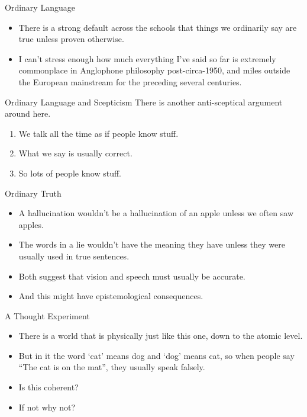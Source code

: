 \documentclass[
  17pt,
  letterpaper,
  ignorenonframetext,
  aspectratio=169,
  handout]{beamer}
\providecommand{\tightlist}{%
  \setlength{\itemsep}{0pt}\setlength{\parskip}{0pt}}\usepackage{longtable,booktabs,array}
\begin{document}
\begin{frame}{Ordinary Language}
\protect\hypertarget{ordinary-language}{}
\begin{itemize}[<+->]
\tightlist
\item
  There is a strong default across the schools that things we ordinarily
  say are true unless proven otherwise.
\item
  I can't stress enough how much everything I've said so far is
  extremely commonplace in Anglophone philosophy post-circa-1950, and
  miles outside the European mainstream for the preceding several
  centuries.
\end{itemize}
\end{frame}

\begin{frame}{Ordinary Language and Scepticism}
\protect\hypertarget{ordinary-language-and-scepticism}{}
There is another anti-sceptical argument around here.

\begin{enumerate}[<+->]
\tightlist
\item
  We talk all the time as if people know stuff.
\item
  What we say is usually correct.
\item
  So lots of people know stuff.
\end{enumerate}
\end{frame}

\begin{frame}{Ordinary Truth}
\protect\hypertarget{ordinary-truth}{}
\begin{itemize}[<+->]
\tightlist
\item
  A hallucination wouldn't be a hallucination of an apple unless we
  often saw apples.
\item
  The words in a lie wouldn't have the meaning they have unless they
  were usually used in true sentences.
\item
  Both suggest that vision and speech must usually be accurate.
\item
  And this might have epistemological consequences.
\end{itemize}
\end{frame}

\begin{frame}{A Thought Experiment}
\protect\hypertarget{a-thought-experiment}{}
\begin{itemize}[<+->]
\tightlist
\item
  There is a world that is physically just like this one, down to the
  atomic level.
\item
  But in it the word `cat' means dog and `dog' means cat, so when people
  say ``The cat is on the mat'', they usually speak falsely.
\item
  Is this coherent?
\item
  If not why not?
\end{itemize}
\end{frame}
\end{document}
